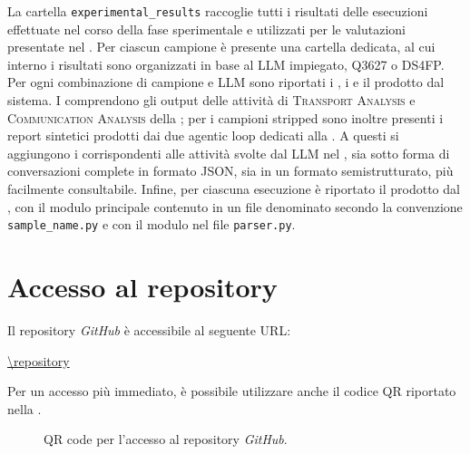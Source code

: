 La cartella \texttt{experimental\_results} raccoglie tutti i risultati delle esecuzioni effettuate nel corso della fase sperimentale e utilizzati per le valutazioni presentate nel . Per ciascun campione è presente una cartella dedicata, al cui interno i risultati sono organizzati in base al LLM impiegato, Q3627 o DS4FP. Per ogni combinazione di campione e LLM sono riportati i \report{}, i \logs{} e il \capture{} prodotto dal sistema. I \report{} comprendono gli output delle attività di \textsc{Transport Analysis} e \textsc{Communication Analysis} della \reversing{}; per i campioni stripped sono inoltre presenti i report sintetici prodotti dai due agentic loop dedicati alla \renaming{}. A questi si aggiungono i \logs{} corrispondenti alle attività svolte dal LLM nel \sreagent{}, sia sotto forma di conversazioni complete in formato JSON, sia in un formato semistrutturato, più facilmente consultabile. Infine, per ciascuna esecuzione è riportato il \capture{} prodotto dal \codeagent{}, con il modulo principale \botnet{} contenuto in un file denominato secondo la convenzione \texttt{sample\_name.py} e con il modulo \parser{} nel file \texttt{parser.py}.


\section{Accesso al repository}

Il repository \emph{GitHub} è accessibile al seguente URL:

\begin{center}
    \url{\repository}
\end{center}

Per un accesso più immediato, è possibile utilizzare anche il codice QR riportato nella .

\vspace{18pt}

\begin{figure}[h]
    \centering
    \qrcode[height=3.0cm]{\repository}
    \caption[QR code per l'accesso al repository]{QR code per l'accesso al repository \emph{GitHub}.}
    \label{fig:qr_repository}
\end{figure}